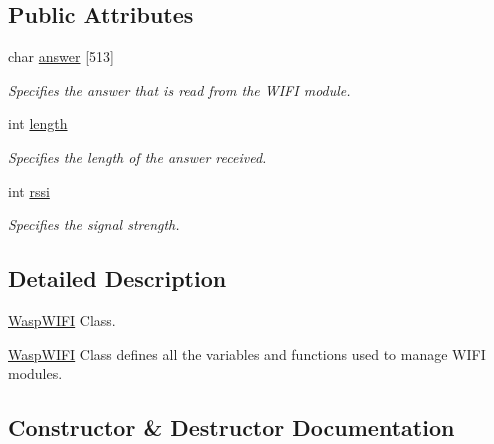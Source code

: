 \subsection*{Public Attributes}
\begin{DoxyCompactItemize}
\item 
char \hyperlink{class_wasp_w_i_f_i_a4375f26f4f941f44b1559103ef3bc090}{answer} \mbox{[}513\mbox{]}\hypertarget{class_wasp_w_i_f_i_a4375f26f4f941f44b1559103ef3bc090}{}\label{class_wasp_w_i_f_i_a4375f26f4f941f44b1559103ef3bc090}

\begin{DoxyCompactList}\small\item\em Specifies the answer that is read from the W\+I\+FI module. \end{DoxyCompactList}\item 
int \hyperlink{class_wasp_w_i_f_i_aab2412fccae7e955115f45ec436df6f9}{length}\hypertarget{class_wasp_w_i_f_i_aab2412fccae7e955115f45ec436df6f9}{}\label{class_wasp_w_i_f_i_aab2412fccae7e955115f45ec436df6f9}

\begin{DoxyCompactList}\small\item\em Specifies the length of the answer received. \end{DoxyCompactList}\item 
int \hyperlink{class_wasp_w_i_f_i_ae7cb140f75e2e4731f835b5b11a539bc}{rssi}\hypertarget{class_wasp_w_i_f_i_ae7cb140f75e2e4731f835b5b11a539bc}{}\label{class_wasp_w_i_f_i_ae7cb140f75e2e4731f835b5b11a539bc}

\begin{DoxyCompactList}\small\item\em Specifies the signal strength. \end{DoxyCompactList}\end{DoxyCompactItemize}


\subsection{Detailed Description}
\hyperlink{class_wasp_w_i_f_i}{Wasp\+W\+I\+FI} Class. 

\hyperlink{class_wasp_w_i_f_i}{Wasp\+W\+I\+FI} Class defines all the variables and functions used to manage W\+I\+FI modules. 

\subsection{Constructor \& Destructor Documentation}
